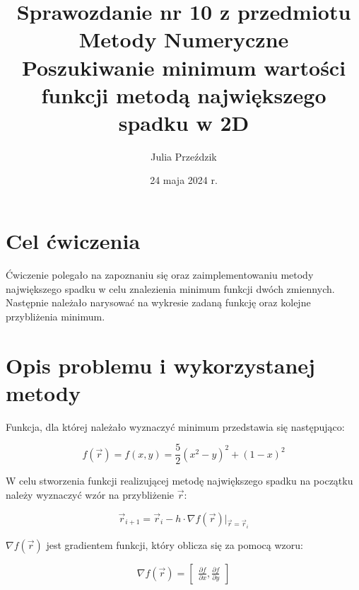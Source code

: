 \documentclass{article}
\begin{document}
\Large

\title{\LARGE Sprawozdanie nr 10 z przedmiotu Metody Numeryczne\\
       \LARGE Poszukiwanie minimum wartości funkcji metodą największego spadku w 2D}
\author{Julia Przeździk}
\date{24 maja 2024 r.}
\maketitle

\large

\section{Cel ćwiczenia}

Ćwiczenie polegało na zapoznaniu się oraz zaimplementowaniu metody największego spadku w celu znalezienia minimum funkcji dwóch zmiennych. Następnie należało narysować na wykresie zadaną funkcję oraz kolejne przybliżenia minimum. 

\section{Opis problemu i wykorzystanej metody}
Funkcja, dla której należało wyznaczyć minimum przedstawia się następująco:

\begin{equation*}
f(\vec{r}) = f(x, y) = \frac{5}{2}(x^2 - y)^2 + (1 - x)^2
\end{equation*}

\noindent
W celu stworzenia funkcji realizującej metodę największego spadku na początku należy wyznaczyć wzór na przybliżenie $\vec r$:

\begin{equation*}
\vec{r}_{i+1} = \vec{r}_i - h \cdot \nabla f(\vec{r}) \bigg|_{\vec{r}=\vec{r}_i}
\end{equation*}

\noindent
$\nabla f(\vec{r})$ jest gradientem funkcji, który oblicza się za pomocą wzoru:

\begin{equation*}
\nabla f(\vec{r}) = \begin{bmatrix} \frac{\partial f}{\partial x}, \frac{\partial f}{\partial y} \end{bmatrix}
\end{equation*}
\end{document}
